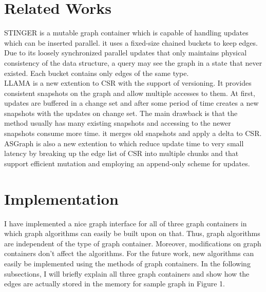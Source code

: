 \documentclass{article}
\begin{document}
\section{Related Works}
STINGER\cite{stinger} is a mutable graph container which is capable of handling updates which can be inserted parallel. it uses a fixed-size chained buckets to keep edges. Due to its loosely synchronized parallel updates that only maintains physical consistency of the data structure, a query may see the graph in a state that never existed. Each bucket contains only edges of the same type.\\
LLAMA\cite{llama} is a new extention to CSR with the support of versioning. It provides consistent snapshots on the graph and allow multiple accesses to them. At first, updates are buffered in a change set and after some period of time creates a new snapshots with the updates on change set. The main drawback is that the method usually has many existing snapshots and accessing to the newer snapshots consume more time. it merges old snapshots and apply a delta to CSR. \\
ASGraph\cite{asgraph} is also a new extention to which reduce update time to very small latency by breaking up the edge list of CSR into multiple chunks and that support efficient mutation and employing an append-only scheme for updates.
 
\section{Implementation}
 I have implemented a nice graph interface for all of three graph containers in which graph algorithms can easily be built upon on that. Thus, graph algorithms are independent of the type of graph container. Moreover, modifications on graph containers don't affect the algorithms. For the future work, new algorithms can easily be implemented using the methods of graph containers. In the following subsections, I will briefly explain all three graph containers and show how the edges are actually stored in the memory for sample graph in Figure 1.
\begin{center} 
 
\end{center}
\end{document}
